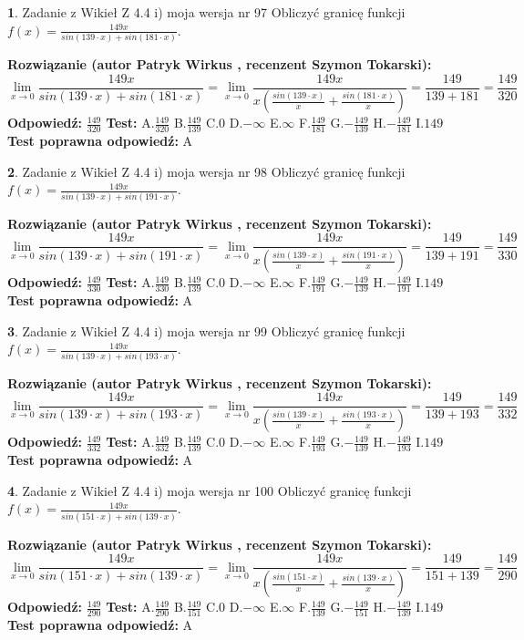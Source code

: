 \documentclass[12pt, a4paper]{article}
\theoremstyle{definition} %
\newtheorem{zad}{}
\newcommand{\zadStart}[1]{\begin{zad}#1\newline}
\newcommand{\zadStop}{\end{zad}}
\newcommand{\rozwStart}[2]{\noindent \textbf{Rozwiązanie (autor #1 , recenzent #2): }\newline}
\newcommand{\rozwStop}{\newline}
\newcommand{\odpStart}{\noindent \textbf{Odpowiedź:}\newline}
\newcommand{\odpStop}{\newline}
\newcommand{\testStart}{\noindent \textbf{Test:}\newline}
\newcommand{\testStop}{\newline}
\newcommand{\kluczStart}{\noindent \textbf{Test poprawna odpowiedź:}\newline}
\newcommand{\kluczStop}{\newline}
\begin{document}
\zadStart{Zadanie z Wikieł Z 4.4 i) moja wersja nr 97}
Obliczyć granicę funkcji $f(x)=\frac{149x}{sin(139\cdot x) +sin(181\cdot x)}$.
\zadStop
\rozwStart{Patryk Wirkus}{Szymon Tokarski}
$$\lim\limits_{x\to 0}\frac{149x}{sin(139\cdot x) +sin(181\cdot x)}=\lim\limits_{x\to 0}\frac{149x}{x(\frac{sin(139\cdot x)}{x}+\frac{sin(181\cdot x)}{x})}=\frac{149}{139+181} = \frac{149}{320}$$
\rozwStop
\odpStart
$\frac{149}{320}$
\odpStop
\testStart
A.$\frac{149}{320}$
B.$\frac{149}{139}$
C.$0$
D.$-\infty$
E.$\infty$
F.$\frac{149}{181}$
G.$-\frac{149}{139}$
H.$-\frac{149}{181}$
I.$149$
\testStop
\kluczStart
A
\kluczStop



\zadStart{Zadanie z Wikieł Z 4.4 i) moja wersja nr 98}
Obliczyć granicę funkcji $f(x)=\frac{149x}{sin(139\cdot x) +sin(191\cdot x)}$.
\zadStop
\rozwStart{Patryk Wirkus}{Szymon Tokarski}
$$\lim\limits_{x\to 0}\frac{149x}{sin(139\cdot x) +sin(191\cdot x)}=\lim\limits_{x\to 0}\frac{149x}{x(\frac{sin(139\cdot x)}{x}+\frac{sin(191\cdot x)}{x})}=\frac{149}{139+191} = \frac{149}{330}$$
\rozwStop
\odpStart
$\frac{149}{330}$
\odpStop
\testStart
A.$\frac{149}{330}$
B.$\frac{149}{139}$
C.$0$
D.$-\infty$
E.$\infty$
F.$\frac{149}{191}$
G.$-\frac{149}{139}$
H.$-\frac{149}{191}$
I.$149$
\testStop
\kluczStart
A
\kluczStop



\zadStart{Zadanie z Wikieł Z 4.4 i) moja wersja nr 99}
Obliczyć granicę funkcji $f(x)=\frac{149x}{sin(139\cdot x) +sin(193\cdot x)}$.
\zadStop
\rozwStart{Patryk Wirkus}{Szymon Tokarski}
$$\lim\limits_{x\to 0}\frac{149x}{sin(139\cdot x) +sin(193\cdot x)}=\lim\limits_{x\to 0}\frac{149x}{x(\frac{sin(139\cdot x)}{x}+\frac{sin(193\cdot x)}{x})}=\frac{149}{139+193} = \frac{149}{332}$$
\rozwStop
\odpStart
$\frac{149}{332}$
\odpStop
\testStart
A.$\frac{149}{332}$
B.$\frac{149}{139}$
C.$0$
D.$-\infty$
E.$\infty$
F.$\frac{149}{193}$
G.$-\frac{149}{139}$
H.$-\frac{149}{193}$
I.$149$
\testStop
\kluczStart
A
\kluczStop



\zadStart{Zadanie z Wikieł Z 4.4 i) moja wersja nr 100}
Obliczyć granicę funkcji $f(x)=\frac{149x}{sin(151\cdot x) +sin(139\cdot x)}$.
\zadStop
\rozwStart{Patryk Wirkus}{Szymon Tokarski}
$$\lim\limits_{x\to 0}\frac{149x}{sin(151\cdot x) +sin(139\cdot x)}=\lim\limits_{x\to 0}\frac{149x}{x(\frac{sin(151\cdot x)}{x}+\frac{sin(139\cdot x)}{x})}=\frac{149}{151+139} = \frac{149}{290}$$
\rozwStop
\odpStart
$\frac{149}{290}$
\odpStop
\testStart
A.$\frac{149}{290}$
B.$\frac{149}{151}$
C.$0$
D.$-\infty$
E.$\infty$
F.$\frac{149}{139}$
G.$-\frac{149}{151}$
H.$-\frac{149}{139}$
I.$149$
\testStop
\kluczStart
A
\kluczStop
\end{document}

